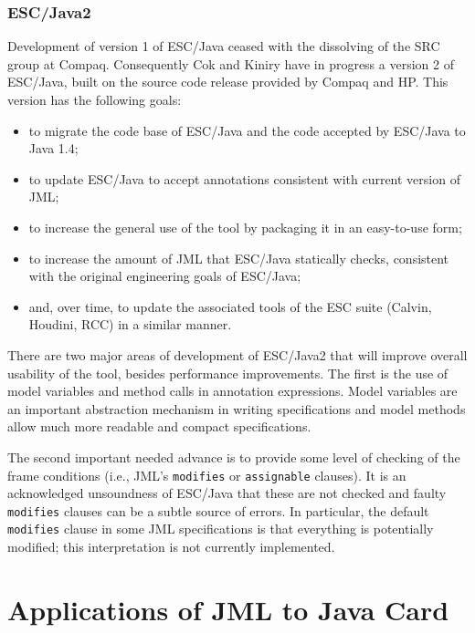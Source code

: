 \subsubsection{ESC/Java2}
\label{escjava2}

Development of version 1 of ESC/Java ceased with the dissolving of the
SRC group at Compaq.  Consequently Cok and Kiniry have in progress a
version 2 of ESC/Java, built on the source code release provided by
Compaq and HP.  This version has the following goals:
\begin{itemize}
\item to migrate the code base of ESC/Java and the code accepted by
  ESC/Java to Java 1.4;
\item to update ESC/Java to accept annotations consistent with current
  version of JML;
\item to increase the general use of the tool by packaging it in an
  easy-to-use form;
\item to increase the amount of JML that ESC/Java statically checks,
  consistent with the original engineering goals of ESC/Java;
\item and, over time, to update the associated tools of the ESC suite
  (Calvin, Houdini, RCC) in a similar manner.
\end{itemize}

There are two major areas of development of ESC/\-Java2 that will
improve overall usability of the tool, besides performance
improvements.  The first is the use of model variables and method
calls in annotation expressions.  Model variables are an important
abstraction mechanism in writing specifications and model methods
allow much more readable and compact specifications. 

The second important needed advance is to provide some level of
checking of the frame conditions (i.e., JML's \texttt{modifies} or
\texttt{assignable} clauses).  It is an acknowledged unsoundness of
ESC/Java that these are not checked and faulty \texttt{modifies}
clauses can be a subtle source of errors.  In particular, the default
\texttt{modifies} clause in some JML specifications is that everything
is potentially modified; this interpretation is not currently
implemented.

\section{Applications of JML to Java Card}
\label{applications}

